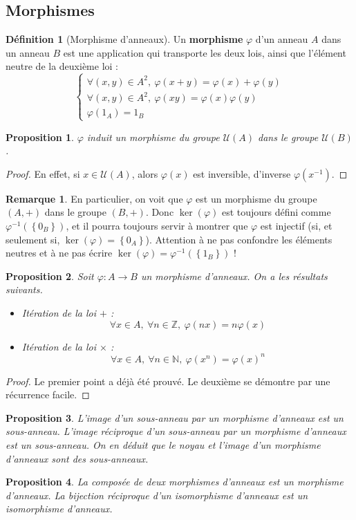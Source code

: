 \documentclass[french]{book}
\newcommand{\N}{\mathbb{N}}
\newcommand{\Z}{\mathbb{Z}}
\newcommand{\inv}{^{-1}}
\theoremstyle{plain}
\newtheorem{prop}{Proposition}[chapter]
\theoremstyle{definition}
\newtheorem{dfn}{Définition}[chapter]
\newtheorem{rmq}{Remarque}[chapter]
\theoremstyle{remark}
\begin{document}
\subsection{Morphismes}
\begin{dfn}[Morphisme d'anneaux]
	Un \textbf{morphisme} $\varphi$ d'un anneau $A$ dans un anneau $B$ est une application qui transporte les deux lois, ainsi que l'élément neutre de la deuxième loi : $$\left \{\begin{array}{lll}\forall(x,y)\in A^2,\ \varphi(x+y)=\varphi(x)+\varphi(y) \\ \forall(x,y)\in A^2,\ \varphi(xy)=\varphi(x)\varphi(y) \\ \varphi(1_A)=1_B\end{array}\right.$$
\end{dfn}
\begin{prop}
	$\varphi$ induit un morphisme du groupe $\mathcal{U}(A)$ dans le groupe $\mathcal{U}(B)$.
\end{prop}
\begin{proof}
	En effet, si $x\in\mathcal{U}(A)$, alors $\varphi(x)$ est inversible, d'inverse $\varphi(x\inv)$.
\end{proof}
\begin{rmq}
	En particulier, on voit que $\varphi$ est un morphisme du groupe $(A,+)$ dans le groupe $(B,+)$. Donc $\ker(\varphi)$ est toujours défini comme $\varphi\inv\left(\left\{0_B\right\}\right)$, et il pourra toujours servir à montrer que $\varphi$ est injectif (si, et seulement si, $\ker(\varphi)=\left\{0_A\right\}$). Attention à ne pas confondre les éléments neutres et à ne pas écrire $\ker(\varphi)=\varphi\inv\left(\left\{1_B\right\}\right)$ !
\end{rmq}
\begin{prop}
	Soit $\varphi:A\rightarrow B$ un morphisme d'anneaux. On a les résultats suivants.
	\begin{itemize}
		\item Itération de la loi $+$ : $$\forall x\in A,\ \forall n\in\Z,\ \varphi(nx)=n\varphi(x)$$
		\item Itération de la loi $\times$ : $$\forall x\in A,\ \forall n\in\N,\ \varphi(x^n)=\varphi(x)^n$$
	\end{itemize}
\end{prop}
\begin{proof}
	Le premier point a déjà été prouvé. Le deuxième se démontre par une récurrence facile.
\end{proof}
\begin{prop}
	L'image d'un sous-anneau par un morphisme d'anneaux est un sous-anneau. L'image réciproque d'un sous-anneau par un morphisme d'anneaux est un sous-anneau. On en déduit que le noyau et l'image d'un morphisme d'anneaux sont des sous-anneaux.
\end{prop}
\begin{prop}
	La composée de deux morphismes d'anneaux est un morphisme d'anneaux. La bijection réciproque d'un isomorphisme d'anneaux est un isomorphisme d'anneaux.
\end{prop}
\end{document}
